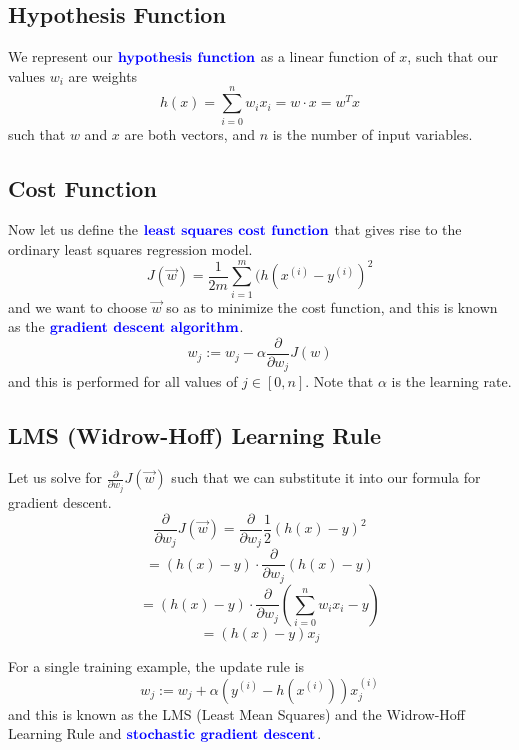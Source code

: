 \documentclass[12pt]{scrartcl}
\begin{document}
\subsection{Hypothesis Function}
\begin{definition}
    We represent our $\textbf{\color{blue} hypothesis function}$ as a linear function of $x$, such that our values $w_i$ are weights
    \[h(x) = \sum_{i=0}^nw_ix_i = w \cdot x = w^Tx\]
    such that $w$ and $x$ are both vectors, and $n$ is the number of input
    variables.

\end{definition}

\subsection{Cost Function}
\begin{definition}
    Now let us define the $\textbf{\color{blue} least squares cost function}$ that gives rise to the ordinary least squares regression model.
    \[J(\vec{w}) = \frac{1}{2m} \sum_{i=1}^m(h(x^{(i)} - y^{(i)})^2\]
    and we want to choose $\vec{w}$ so as to minimize the cost function, and this
    is known as the $\textbf{\color{blue} gradient descent algorithm}$.
    \[w_j := w_j - \alpha \frac{\partial}{\partial w_j}J(w)\]
    and this is performed for all values of $j \in [0, n]$. Note that $\alpha$ is
    the learning rate.
\end{definition}
\subsection{LMS (Widrow-Hoff) Learning Rule}
Let us solve for $\frac{\partial}{\partial w_j}J(\vec{w})$ such that we can substitute it into our formula for
gradient descent.
\[\frac{\partial}{\partial w_j}J(\vec{w}) = \frac{\partial}{\partial w_j}\frac{1}{2}(h(x) - y)^2\]
\[= (h(x) - y) \cdot \frac{\partial}{\partial w_j}(h(x) - y)\]
\[= (h(x) - y) \cdot \frac{\partial}{\partial w_j}(\sum_{i=0}^nw_ix_i - y)\]
\[= (h(x) - y)x_j\]
\begin{definition}
    For a single training example, the update rule is
    \[w_j := w_j + \alpha(y^{(i)} - h(x^{(i)}))x_j^{(i)}\]
    and this is known as the LMS (Least Mean Squares) and the Widrow-Hoff Learning
    Rule and $\textbf{\color{blue} stochastic gradient descent}$.
\end{definition}
\end{document}
